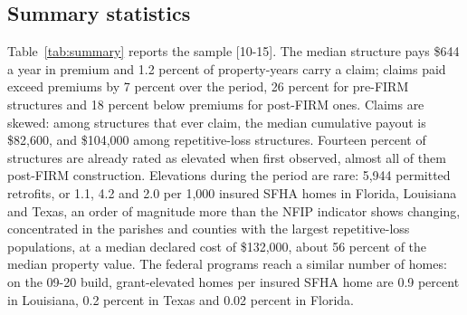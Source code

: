 \subsection{Summary statistics}

Table~\ref{tab:summary} reports the sample [10-15]. The median structure pays \$644 a year
in premium and 1.2 percent of property-years carry a claim; claims paid exceed premiums by 7
percent over the period, 26 percent for pre-FIRM structures and 18 percent below premiums for
post-FIRM ones. Claims are skewed: among structures that ever claim, the median cumulative
payout is \$82,600, and \$104,000 among repetitive-loss structures. Fourteen percent of
structures are already rated as elevated when first observed, almost all of them post-FIRM
construction. Elevations during the period are rare: 5,944 permitted retrofits, or 1.1, 4.2
and 2.0 per 1,000 insured SFHA homes in Florida, Louisiana and Texas, an order of magnitude
more than the NFIP indicator shows changing, concentrated in the parishes and counties with the
largest repetitive-loss populations, at a median declared cost of \$132,000, about 56 percent
of the median property value. The
federal programs reach a similar number of homes: on the 09-20 build, grant-elevated homes
per insured SFHA home are 0.9 percent in Louisiana, 0.2 percent in Texas and 0.02 percent in
Florida.

